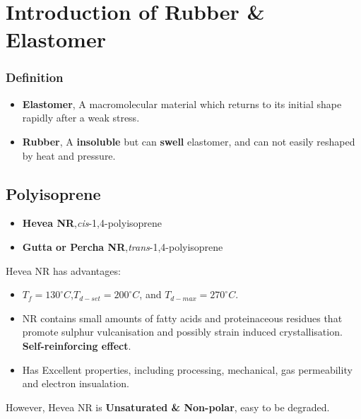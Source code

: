 \documentclass{NoteThesis/note-thesis}
\begin{document}
\maketitle

\tableofcontents

\newpage

\section{Introduction of Rubber \& Elastomer}

\subsubsection*{Definition}

\begin{itemize}
    \item \textbf{Elastomer}, A macromolecular material which returns to its initial shape rapidly after a weak stress.
    \item \textbf{Rubber}, A \textbf{insoluble} but can \textbf{swell} elastomer, and can not easily reshaped by heat and pressure.
\end{itemize}

\subsection{Polyisoprene}

\begin{itemize}
    \item \textbf{Hevea NR},\textit{cis}-1,4-polyisoprene
    \item \textbf{Gutta or Percha NR},\textit{trans}-1,4-polyisoprene
\end{itemize}

Hevea NR has advantages:

\begin{itemize}
    \item $T_f=130^\circ C$,$T_{d-set}=200^\circ C$, and $T_{d-max}=270^\circ C$.
    \item NR contains small amounts of fatty acids and proteinaceous residues that promote sulphur vulcanisation and possibly strain induced crystallisation. \textbf{Self-reinforcing effect}.
    \item Has Excellent properties, including processing, mechanical, gas permeability and electron insualation.
\end{itemize}

However, Hevea NR is \textbf{Unsaturated \& Non-polar}, easy to be degraded.
\end{document}
